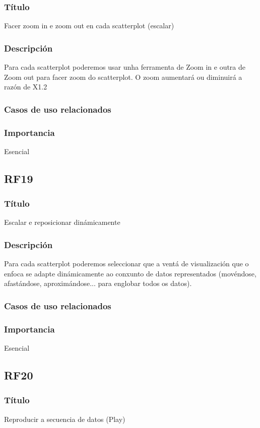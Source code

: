 \subsubsection{Título}
Facer zoom in e zoom out en cada scatterplot (escalar)
\subsubsection{Descripción}
Para cada scatterplot poderemos usar unha ferramenta de Zoom in e outra de Zoom out para facer zoom do scatterplot. O zoom aumentará ou diminuirá a razón de X1.2
\subsubsection{Casos de uso relacionados}
\subsubsection{Importancia}
Esencial

\subsection*{RF19}
\subsubsection{Título}
Escalar e reposicionar dinámicamente
\subsubsection{Descripción}
Para cada scatterplot poderemos seleccionar que a ventá de visualización que o enfoca se adapte dinámicamente ao conxunto de datos representados (movéndose, afastándose, aproximándose... para englobar todos os datos).
\subsubsection{Casos de uso relacionados}
\subsubsection{Importancia}
Esencial

\subsection*{RF20}
\subsubsection{Título}
Reproducir a secuencia de datos (Play)
